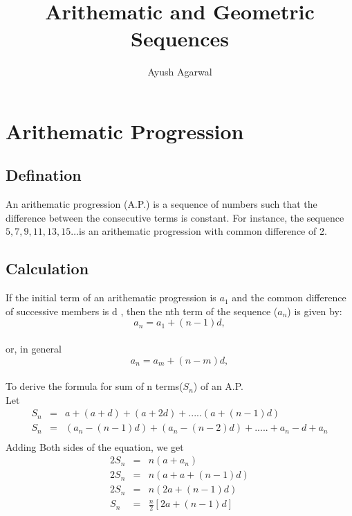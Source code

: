 \documentclass[a4paper,10pt]{article}
\title{Arithematic and Geometric Sequences}
\author{Ayush Agarwal}
\date{}
\begin{document}
\maketitle


\section{Arithematic Progression}
\subsection*{Defination}
An arithematic progression (A.P.) is a sequence of numbers such that the difference between the consecutive terms is constant. 
For instance, the sequence $5, 7, 9, 11, 13, 15 … $is an arithematic progression with common difference of 2. \cite{wiki1} \\

\subsection*{Calculation}
If the initial term of an arithematic progression is $a_1$ and the common difference of successive members is d
, then the nth term of the sequence ($a_n$) is given by:\\
\vspace{2mm}
 $$a_n = a_1 + (n - 1)d,$$\\
 or, in general
 $$a_n = a_m + (n - m)d,$$\\
To derive the formula for sum of n terms($S_n$) of an A.P.\\
Let \\
\begin{eqnarray*}
S_n&=& a + (a + d) + (a + 2d) + ..... (a + (n - 1)d)\\
S_n&=&(a_n - (n - 1)d) + (a_n - (n - 2)d) + ..... + a_n - d + a_n\\
\end{eqnarray*}
\textrm Adding Both sides of the equation, we get\\
\begin{eqnarray*}
2S_n&=& n(a + a_n)\\
2S_n&=& n(a + a + (n - 1)d) \\
2S_n&=& n(2a + (n - 1)d) \\
S_n&=& \frac{n}{2}[2a + (n - 1)d] \\
\end{eqnarray*} 
\end{document}
